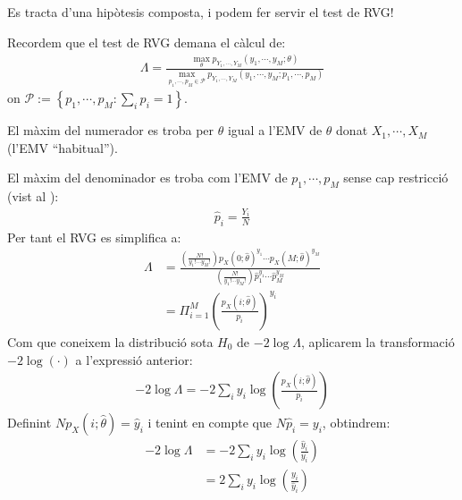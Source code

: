 \documentclass[letterpaper,10pt,english]{sphinxmanual}
\begin{document}
Es tracta d’una hipòtesis composta, i podem fer servir el test de RVG!

Recordem que el test de RVG demana el càlcul de:
\begin{equation*}
\begin{split}\Lambda = \frac{\max_{\theta} p_{Y_1, \cdots, Y_M}(y_1, \cdots, y_M; \theta)}{\max_{p_1, \cdots, p_M \in \mathcal{P}} p_{Y_1, \cdots, Y_M}(y_1, \cdots, y_M; p_1, \cdots, p_M)}\end{split}
\end{equation*}
on \(\mathcal{P} := \left\{p_1, \cdots, p_M: \sum_i p_i =1 \right\}\).

El màxim del numerador es troba per \(\theta\) igual a l’EMV de \(\theta\) donat
\(X_1, \cdots, X_M\) (l’EMV “habitual”).

El màxim del denominador es troba com l’EMV de \(p_1, \cdots, p_M\) sense cap restricció
(vist al ):
\begin{equation*}
\begin{split}\hat{p}_i = \frac{Y_i}{N}\end{split}
\end{equation*}
Per tant el RVG es simplifica a:
\begin{equation*}
\begin{split}\Lambda &= \frac{\left( \frac{N!}{y_1! \cdots y_M!} \right) p_X(0;\hat{\theta})^{y_1} \cdots p_X(M;\hat{\theta})^{y_M}}{ \left( \frac{N!}{y_1! \cdots y_M!} \right) \hat{p}_1^{y_1} \cdots \hat{p}_M^{y_M}} \\
&= \Pi_{i=1}^M \left(\frac{p_X(i;\hat{\theta})}{p_i} \right)^{y_i}\end{split}
\end{equation*}
Com que coneixem la distribució sota \(H_0\) de \(-2\log \Lambda\), aplicarem la transformació
\(-2\log(\cdot)\) a l’expressió anterior:
\begin{equation*}
\begin{split}-2 \log\Lambda = -2  \sum_i y_i \log \left(\frac{p_X(i;\hat{\theta})}{p_i} \right)\end{split}
\end{equation*}
Definint \(N p_X(i;\hat{\theta}) = \hat{y}_i\) i tenint en compte que \(N \hat{p}_i = y_i\),
obtindrem:
\begin{equation*}
\begin{split}-2 \log\Lambda & = -2 \sum_i y_i \log \left(\frac{\hat{y}_i}{y_i} \right) \\
&= 2 \sum_i y_i \log \left(\frac{y_i}{\hat{y}_i} \right)\end{split}
\end{equation*}
\end{document}
